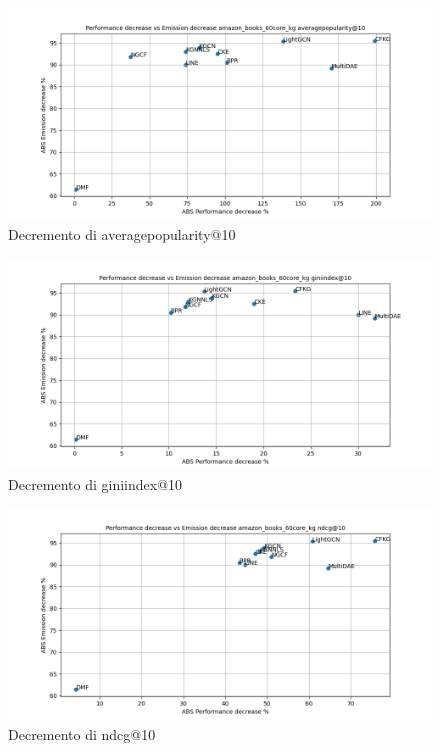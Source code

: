 \begin{figure}[H]
    \centering
    \includegraphics[scale=0.5]{images/decrement_averagepopularity@10_amazon_books_60core_kg.png}
    \caption{Decremento di averagepopularity@10}
\end{figure}

\begin{figure}[H]
    \centering
    \includegraphics[scale=0.5]{images/decrement_giniindex@10_amazon_books_60core_kg.png}
    \caption{Decremento di giniindex@10}
\end{figure}

\begin{figure}[H]
    \centering
    \includegraphics[scale=0.5]{images/decrement_ndcg@10_amazon_books_60core_kg.png}
    \caption{Decremento di ndcg@10}
\end{figure}

